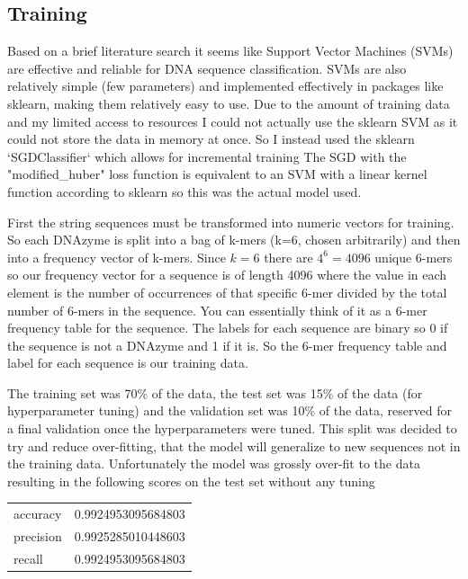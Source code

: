 \documentclass[11pt]{article}
\begin{document}
\subsection*{Training}
Based on a brief literature search it seems like Support Vector Machines (SVMs) are effective and reliable for DNA sequence classification.
SVMs are also relatively simple (few parameters) and implemented effectively in packages like sklearn, making them relatively easy to use.
Due to the amount of training data and my limited access to resources I could not actually use the sklearn SVM as it could not store the data in memory at once.
So I instead used the sklearn `SGDClassifier` which allows for incremental training
The SGD with the "modified\_huber" loss function is equivalent to an SVM with a linear kernel function according to sklearn so this was the actual model used.

First the string sequences must be transformed into numeric vectors for training.
So each DNAzyme is split into a bag of k-mers (k=6, chosen arbitrarily) and then into a frequency vector of k-mers.
Since $k=6$ there are $4^6=4096$ unique 6-mers so our frequency vector for a sequence is of length 4096 where the value in each element is the number of occurrences of that specific 6-mer divided by the total number of 6-mers in the sequence.
You can essentially think of it as a 6-mer frequency table for the sequence.
The labels for each sequence are binary so 0 if the sequence is not a DNAzyme and 1 if it is.
So the 6-mer frequency table and label for each sequence is our training data.

The training set was 70\% of the data, the test set was 15\% of the data (for hyperparameter tuning) and the validation set was 10\% of the data, reserved for a final validation once the hyperparameters were tuned.
This split was decided to try and reduce over-fitting, that the model will generalize to new sequences not in the training data.
Unfortunately the model was grossly over-fit to the data resulting in the following scores on the test set without any tuning
\begin{center} \begin{tabular}{l l}
    accuracy   & 0.9924953095684803 \\
    precision  & 0.9925285010448603 \\
    recall     & 0.9924953095684803 \\
\end{tabular}\end{center}
\end{document}
